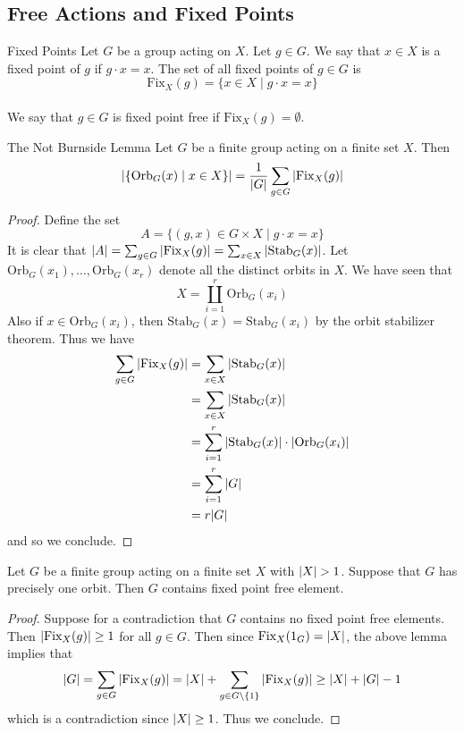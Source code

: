 \documentclass[a4paper]{article}
\begin{document}
\subsection{Free Actions and Fixed Points}
\begin{defn}{Fixed Points}{} Let $G$ be a group acting on $X$. Let $g\in G$. We say that $x\in X$ is a fixed point of $g$ if $g\cdot x=x$. The set of all fixed points of $g\in G$ is $$\text{Fix}_X(g)=\{x\in X\;|\;g\cdot x=x\}$$~\\
We say that $g\in G$ is fixed point free if $\text{Fix}_X(g)=\emptyset$. 
\end{defn}

\begin{lmm}{The Not Burnside Lemma}{} Let $G$ be a finite group acting on a finite set $X$. Then $$\abs{\{\text{Orb}_G(x)\;|\;x\in X\}}=\frac{1}{\abs{G}}\sum_{g\in G}\abs{\text{Fix}_X(g)}$$ \tcbline
\begin{proof}
Define the set $$A=\{(g,x)\in G\times X\;|\;g\cdot x=x\}$$ It is clear that $\abs{A}=\sum_{g\in G}\abs{\text{Fix}_X(g)}=\sum_{x\in X}\abs{\text{Stab}_G(x)}$. Let $\text{Orb}_G(x_1),\dots,\text{Orb}_G(x_r)$ denote all the distinct orbits in $X$. We have seen that $$X=\coprod_{i=1}^r\text{Orb}_G(x_i)$$ Also if $x\in\text{Orb}_G(x_i)$, then $\text{Stab}_G(x)=\text{Stab}_G(x_i)$ by the orbit stabilizer theorem. Thus we have 
\begin{align*}
\sum_{g\in G}\abs{\text{Fix}_X(g)}&=\sum_{x\in X}\abs{\text{Stab}_G(x)}\\
&=\sum_{x\in X}\abs{\text{Stab}_G(x)}\\
&=\sum_{i=1}^r\abs{\text{Stab}_G(x)}\cdot\abs{\text{Orb}_G(x_i)}\\
&=\sum_{i=1}^r\abs{G}\\
&=r\abs{G}
\end{align*}
and so we conclude. 
\end{proof}
\end{lmm}

\begin{crl}{}{} Let $G$ be a finite group acting on a finite set $X$ with $\abs{X}>1$. Suppose that $G$ has precisely one orbit. Then $G$ contains fixed point free element. \tcbline
\begin{proof}
Suppose for a contradiction that $G$ contains no fixed point free elements. Then $\abs{\text{Fix}_X(g)}\geq 1$ for all $g\in G$. Then since $\text{Fix}_X(1_G)=\abs{X}$, the above lemma implies that $$\abs{G}=\sum_{g\in G}\abs{\text{Fix}_X(g)}=\abs{X}+\sum_{g\in G\setminus\{1\}}\abs{\text{Fix}_X(g)}\geq\abs{X}+\abs{G}-1$$ which is a contradiction since $\abs{X}\geq 1$. Thus we conclude. 
\end{proof}
\end{crl}
\end{document}
